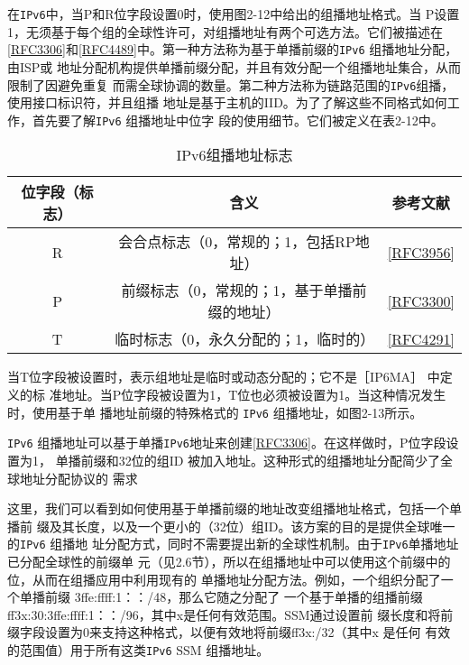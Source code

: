 在\verb|IPv6|中，当P和R位字段设置0时，使用图2-12中给出的组播地址格式。当
P设置1，无须基于每个组的全球性许可，对组播地址有两个可选方法。它们被描述在
\href{https://www.rfc-editor.org/rfc/rfc3306}{[RFC3306]}和\href{https://www.rfc-editor.org/rfc/rfc4489}{[RFC4489]}中。第一种方法称为基于单播前缀的\verb|IPv6| 组播地址分配，由ISP或
地址分配机构提供单播前缀分配，并且有效分配一个组播地址集合，从而限制了因避免重复
而需全球协调的数量。第二种方法称为链路范围的\verb|IPv6|组播，使用接口标识符，并且组播
地址是基于主机的IID。为了了解这些不同格式如何工作，首先要了解\verb|IPv6| 组播地址中位字
段的使用细节。它们被定义在表2-12中。

\begin{table}[H]
    \centering
    \caption{IPv6组播地址标志}
    \begin{tabular}{c|c|c}
        \hline
        位字段（标志）  &	含义	            &	参考文献  \\ \hline
        R   &	会合点标志（0，常规的；1，包括RP地址）	        &	\href{https://www.rfc-editor.org/rfc/rfc3956}{[RFC3956]}  \\ \hline
        P	&	前缀标志（0，常规的；1，基于单播前缀的地址）	&	\href{https://www.rfc-editor.org/rfc/rfc3300}{[RFC3300]}  \\ \hline
        T	&	临时标志（0，永久分配的；1，临时的）	       &	\href{https://www.rfc-editor.org/rfc/rfc4291}{[RFC4291]}  \\ \hline
    \end{tabular}
\end{table}

当T位字段被设置时，表示组地址是临时或动态分配的；它不是［IP6MA］ 中定义的标
准地址。当P位字段被设置为1，T位也必须被设置为1。当这种情况发生时，使用基于单
播地址前缀的特殊格式的 \verb|IPv6| 组播地址，如图2-13所示。

\verb|IPv6| 组播地址可以基于单播\verb|IPv6|地址来创建\href{https://www.rfc-editor.org/rfc/rfc3306}{[RFC3306]}。在这样做时，P位字段设置为1，
单播前缀和32位的组ID 被加入地址。这种形式的组播地址分配简少了全球地址分配协议的
需求

这里，我们可以看到如何使用基于单播前缀的地址改变组播地址格式，包括一个单播前
缀及其长度，以及一个更小的（32位）组ID。该方案的目的是提供全球唯一的\verb|IPv6| 组播地
址分配方式，同时不需要提出新的全球性机制。由于\verb|IPv6|单播地址已分配全球性的前缀单
元（见2.6节），所以在组播地址中可以使用这个前缀中的位，从而在组播应用中利用现有的
单播地址分配方法。例如，一个组织分配了一个单播前缀 3ffe:ffff:1：：/48，那么它随之分配了
一个基于单播的组播前缀 ff3x:30:3ffe:ffff:1：：/96，其中x是任何有效范围。SSM通过设置前
缀长度和将前缀字段设置为0来支持这种格式，以便有效地将前缀ff3x:/32（其中x 是任何
有效的范围值）用于所有这类\verb|IPv6| SSM 组播地址。

